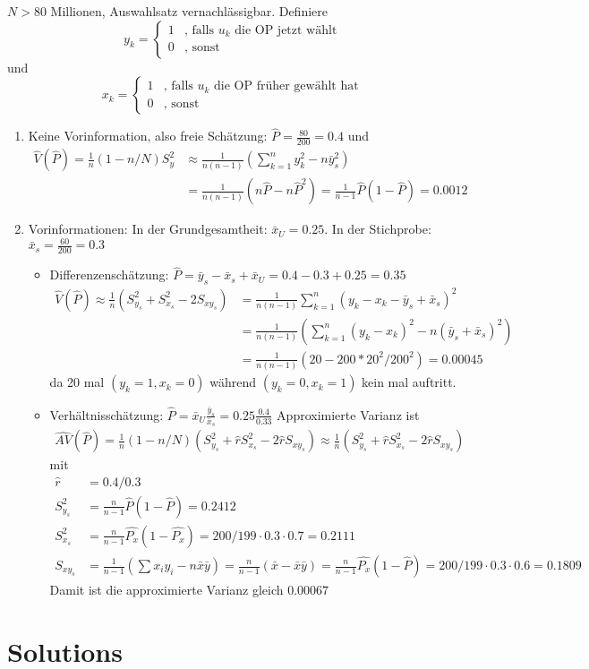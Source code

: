 \documentclass{article}
\begin{document}
\begin{solution}
$N>80$ Millionen, Auswahlsatz vernachlässigbar. Definiere $$y_k = \begin{cases}
1 &\text{, falls } u_k \text{ die OP jetzt wählt}\\
0 &\text{, sonst}
\end{cases}$$ und $$x_k = \begin{cases}
1 &\text{, falls } u_k \text{ die OP früher gewählt hat}\\
0 &\text{, sonst}
\end{cases}$$
\begin{enumerate}
	\item Keine Vorinformation, also freie Schätzung: $\hat{P} = \frac{80}{200}=0.4$ und 
	\begin{align*}
	\hat{V}(\hat{P}) = \frac{1}{n}(1-n/N)S_y^2 &\approx \frac{1}{n(n-1)}\left(\sum_{k=1}^n y_k^2 - n \bar{y}_s^2\right)\\
	&= \frac{1}{n(n-1)}\left(n \hat{P}-n\hat{P}^2\right) = \frac{1}{n-1}\hat{P}(1-\hat{P}) = 0.0012
	\end{align*}
\item Vorinformationen: In der Grundgesamtheit: $\bar{x}_U = 0.25$. In der Stichprobe: $\bar{x}_s = \frac{60}{200} = 0.3$
\begin{itemize}
	\item Differenzenschätzung: $\hat{P} = \bar{y}_s - \bar{x}_s + \bar{x}_U = 0.4-0.3+0.25 = 0.35$
	\begin{align*}
	\hat{V}(\hat{P}) \approx \frac{1}{n}(S_{y_s}^2+S_{x_s}^2-2S_{xy_s}) &= \frac{1}{n(n-1)}\sum_{k=1}^n\left(y_k - x_k - \bar{y}_s + \bar{x}_s\right)^2\\
	&= \frac{1}{n(n-1)}\left(\sum_{k=1}^n (y_k-x_k)^2 - n (\bar{y}_s+\bar{x}_s)^2\right)\\
	&= \frac{1}{n(n-1)}\left(20 - 200*20^2/200^2\right) = 0.00045
	\end{align*}
	da 20 mal $(y_k=1,x_k=0)$ während $(y_k=0,x_k=1)$ kein mal auftritt.
	\item Verhältnisschätzung: $\hat{P}=\bar{x}_U \frac{\bar{y}_s}{\bar{x}_s} = 0.25 \frac{0.4}{0.33}$ Approximierte Varianz ist
	\begin{align*}
	\hat{AV}(\hat{P}) = \frac{1}{n}(1-n/N)\left(S_{y_s}^2+\hat{r}S_{x_s}^2 - 2 \hat{r}S_{xy_s}\right) \approx \frac{1}{n}\left(S_{y_s}^2+\hat{r}S_{x_s}^2 - 2 \hat{r}S_{xy_s}\right)
	\end{align*}
	mit 
	\begin{align*}
	\hat{r} &= 0.4/0.3\\
	S_{y_s}^2 &= \frac{n}{n-1}\hat{P}(1-\hat{P}) = 0.2412\\
	S_{x_s}^2 &= \frac{n}{n-1}\hat{P_x}(1-\hat{P_x}) = 200/199 \cdot 0.3 \cdot 0.7 = 0.2111\\
	S_{xy_s} &= \frac{1}{n-1}(\sum x_i y_i - n \bar{x}\bar{y}) = \frac{n}{n-1}(\bar{x}-\bar{x}\bar{y})=\frac{n}{n-1}\hat{P_x}(1-\hat{P}) = 200/199 \cdot 0.3 \cdot 0.6 = 0.1809
	\end{align*}
	Damit ist die approximierte Varianz gleich $0.00067$
\end{itemize}
\end{enumerate}
\end{solution}

\newpage
\appendix
\section*{Solutions}

\end{document}
